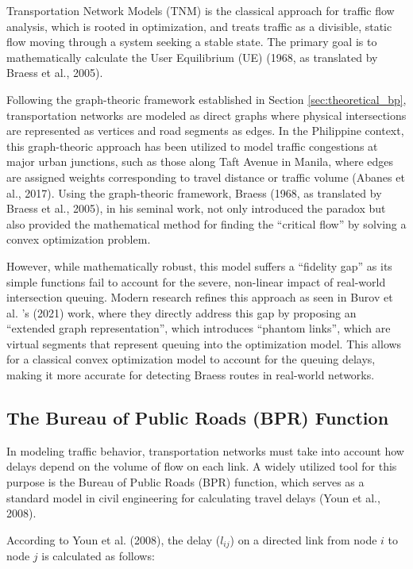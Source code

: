 Transportation Network Models (TNM) is the classical approach for traffic flow analysis, which is rooted in optimization, and treats traffic as a divisible, static flow moving through a system seeking a stable state. The primary goal is to mathematically calculate the User Equilibrium (UE) (1968, as translated by Braess et al., 2005).

Following the graph-theoric framework established in Section \ref{sec:theoretical_bp}, transportation networks are modeled as direct graphs where physical intersections are represented as vertices and road segments as edges. In the Philippine context, this graph-theoric approach has been utilized to model traffic congestions at major urban junctions, such as those along Taft Avenue in Manila, where edges are assigned weights corresponding to travel distance or traffic volume (Abanes et al., 2017). Using the graph-theoric framework, Braess (1968, as translated by Braess et al., 2005), in his seminal work, not only introduced the paradox but also provided the mathematical method for finding the “critical flow” by solving a convex optimization problem.

However, while mathematically robust, this model suffers a “fidelity gap” as its simple functions fail to account for the severe, non-linear impact of real-world intersection queuing. Modern research refines this approach as seen in Burov et al. 's (2021) work, where they directly address this gap by proposing an “extended graph representation”, which introduces “phantom links”, which are virtual segments that represent queuing into the optimization model. This allows for a classical convex optimization model to account for the queuing delays, making it more accurate for detecting Braess routes in real-world networks.

\subsection{The Bureau of Public Roads (BPR) Function}
\label{chap:BPR}

In modeling traffic behavior, transportation networks must take into account how delays depend on the volume of flow on each link. A widely utilized tool for this purpose is the Bureau of Public Roads (BPR) function, which serves as a standard model in civil engineering for calculating travel delays (Youn et al., 2008).

According to Youn et al. (2008), the delay ($l_{ij}$) on a directed link from node $i$ to node $j$ is calculated as follows:

